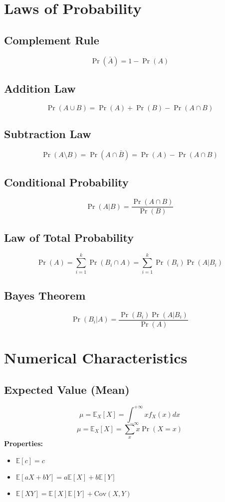 \documentclass{article}
\begin{document}
\newpage
\section{Laws of Probability}

\subsection{Complement Rule}
\[
    \Pr(\bar{A}) = 1 - \Pr(A)
\]

\subsection{Addition Law}
\[
    \Pr(A \cup B) = \Pr(A) + \Pr(B) - \Pr(A \cap B)
\]

\subsection{Subtraction Law}
\[
    \Pr(A \setminus B) = \Pr(A \cap \bar{B}) = \Pr(A) - \Pr(A \cap B)
\]

\subsection{Conditional Probability}
\[
    \Pr(A|B) = \frac{\Pr(A \cap B)}{\Pr(B)}
\]

\subsection{Law of Total Probability}
\[
    \Pr(A) = \sum_{i=1}^{k} \Pr(B_i \cap A) = \sum_{i=1}^{k} \Pr(B_i)\Pr(A|B_i)
\]

\subsection{Bayes Theorem}
\[
    \Pr(B_i|A) = \frac{\Pr(B_i)\Pr(A|B_i)}{\Pr(A)}
\]

\newpage
\section{Numerical Characteristics}

\subsection{Expected Value (Mean)}
\[
    \mu = \mathbb{E}_X[X] = \int_{-\infty}^{+\infty} x f_X(x) dx
\]
\[
    \mu = \mathbb{E}_X[X] = \sum_{x} x \Pr(X=x)
\]
\textbf{Properties:}
\begin{itemize}
    \item \( \mathbb{E}[c] = c \)
    \item \( \mathbb{E}[aX+bY] = a\mathbb{E}[X] + b\mathbb{E}[Y] \)
    \item \( \mathbb{E}[XY] = \mathbb{E}[X]\mathbb{E}[Y] + \text{Cov}(X,Y) \)
\end{itemize}
\end{document}
